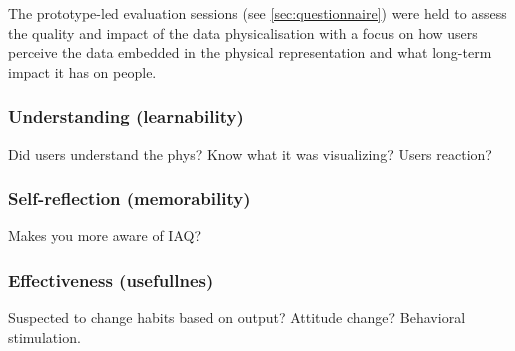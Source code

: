 The prototype-led evaluation sessions (see \ref{sec:questionnaire}) were held to assess the quality and impact of the data physicalisation with a focus on how users perceive the data embedded in the physical representation and what long-term impact it has on people.


\subsubsection{Understanding (learnability)}

Did users understand the phys? Know what it was visualizing? Users reaction?

\subsubsection{Self-reflection (memorability)}

Makes you more aware of IAQ?

\subsubsection{Effectiveness (usefullnes)}

Suspected to change habits based on output? Attitude change? Behavioral stimulation.



